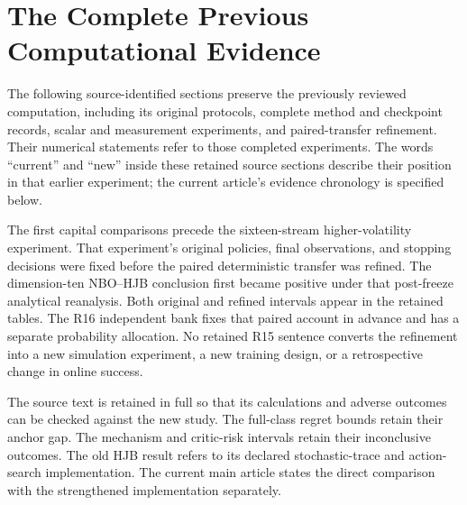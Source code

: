 \section{The Complete Previous Computational Evidence}
\label{app:r16previousrecord}
The following source-identified sections preserve the previously reviewed computation, including its original protocols, complete method and checkpoint records, scalar and measurement experiments, and paired-transfer refinement. Their numerical statements refer to those completed experiments. The words ``current'' and ``new'' inside these retained source sections describe their position in that earlier experiment; the current article's evidence chronology is specified below.

The first capital comparisons precede the sixteen-stream higher-volatility experiment. That experiment's original policies, final observations, and stopping decisions were fixed before the paired deterministic transfer was refined. The dimension-ten NBO--HJB conclusion first became positive under that post-freeze analytical reanalysis. Both original and refined intervals appear in the retained tables. The R16 independent bank fixes that paired account in advance and has a separate probability allocation. No retained R15 sentence converts the refinement into a new simulation experiment, a new training design, or a retrospective change in online success.

The source text is retained in full so that its calculations and adverse outcomes can be checked against the new study. The full-class regret bounds retain their anchor gap. The mechanism and critic-risk intervals retain their inconclusive outcomes. The old HJB result refers to its declared stochastic-trace and action-search implementation. The current main article states the direct comparison with the strengthened implementation separately.

